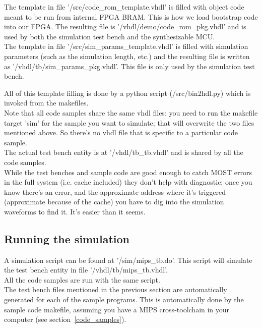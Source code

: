 \documentclass[11pt]{article}
\begin{document}
    The template in file '/src/code\_rom\_template.vhdl' is filled with object
    code meant to be run from internal FPGA BRAM. This is how we load bootstrap
    code into our FPGA. The resulting file is '/vhdl/demo/code\_rom\_pkg.vhdl'
    and is used by both the simulation test bench and the synthesizable MCU.\\
    
    The template in file '/src/sim\_params\_template.vhdl' is filled with 
    simulation parameters (such as the simulation length, etc.) and the resulting 
    file is written as '/vhdl/tb/sim\_params\_pkg.vhdl'. This file is only used
    by the simulation test bench.
    
    All of this template filling is done by a python script (/src/bin2hdl.py) 
    which is invoked from the makefiles.\\
    
    Note that all code samples share the same vhdl files: you need to run the 
    makefile target 'sim' for the sample you want to simulate; that will 
    overwrite the two files mentioned above. So there's no vhdl file that is
    specific to a particular code sample.\\
    
    The actual test bench entity is at '/vhdl/tb\_tb.vhdl' and is shared by all
    the code samples.\\
    
    While the test benches and sample code are good enough to catch MOST errors
    in the full system (i.e. cache included) they don't help with diagnostic;
    once you know there's an error, and the approximate address where it's
    triggered (approximate because of the cache) you have to dig into the 
    simulation waveforms to find it. It's easier than it seems.\\
    
\subsection{Running the simulation}
\label{running_the_simulation}

    A simulation script can be found at '/sim/mips\_tb.do'. This script will
    simulate the test bench entity in file '/vhdl/tb/mips\_tb.vhdl'.\\
    
    All the code samples are run with the same script.\\

    The test bench files mentioned in the previous section are automatically 
    generated for each of the sample programs. This is automatically done by the 
    sample code makefile,
    assuming you have a MIPS cross-toolchain in your computer (see section~\ref{code_samples}).\\
\end{document}
